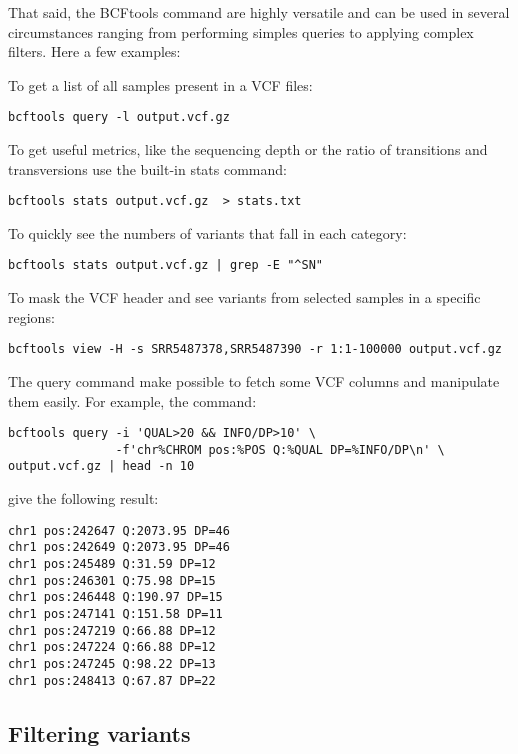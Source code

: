 That said, the BCFtools command are highly versatile and can be used in several circumstances ranging from performing simples queries to applying complex filters. Here a few examples:

To get a list of all samples present in a VCF files:

\begin{verbatim}
bcftools query -l output.vcf.gz
\end{verbatim}

To get useful metrics, like the sequencing depth or the ratio of transitions and transversions use the built-in stats command:
\begin{verbatim}
bcftools stats output.vcf.gz  > stats.txt
\end{verbatim}

To quickly see the numbers of variants that fall in each category:
\begin{verbatim}
bcftools stats output.vcf.gz | grep -E "^SN"
\end{verbatim}

To mask the VCF header and see variants from selected samples in a specific regions:
\begin{verbatim}
bcftools view -H -s SRR5487378,SRR5487390 -r 1:1-100000 output.vcf.gz
\end{verbatim}


The query command make possible to fetch some VCF columns and manipulate them easily. For example, the command:

\begin{verbatim}
bcftools query -i 'QUAL>20 && INFO/DP>10' \
	           -f'chr%CHROM pos:%POS Q:%QUAL DP=%INFO/DP\n' \
output.vcf.gz | head -n 10
\end{verbatim}

give the following result:
\begin{verbatim}
chr1 pos:242647 Q:2073.95 DP=46
chr1 pos:242649 Q:2073.95 DP=46
chr1 pos:245489 Q:31.59 DP=12
chr1 pos:246301 Q:75.98 DP=15
chr1 pos:246448 Q:190.97 DP=15
chr1 pos:247141 Q:151.58 DP=11
chr1 pos:247219 Q:66.88 DP=12
chr1 pos:247224 Q:66.88 DP=12
chr1 pos:247245 Q:98.22 DP=13
chr1 pos:248413 Q:67.87 DP=22
\end{verbatim}






\subsection{Filtering variants}





